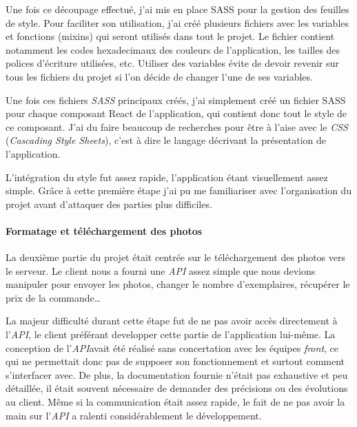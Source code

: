 \documentclass[12pt,a4paper]{article}
\begin{document}
  \bigskip

  Une fois ce découpage effectué, j'ai mis en place SASS pour la gestion
  des feuilles de style. Pour faciliter son utilisation, j'ai créé
  plusieurs fichiers avec les variables et fonctions (mixins) qui seront
  utilisés dans tout le projet. Le fichier contient notamment les codes
  hexadecimaux des couleurs de l'application, les tailles des polices
  d'écriture utilisées, etc. Utiliser des variables évite de devoir
  revenir sur tous les fichiers du projet si l'on décide de changer l'une
  de ses variables.

  \bigskip

  Une fois ces fichiers \emph{SASS} principaux créés, j'ai simplement créé
  un fichier SASS pour chaque composant React de l'application, qui
  contient donc tout le style de ce composant. J'ai du faire beaucoup de
  recherches pour être à l'aise avec le \emph{CSS} (\emph{Cascading Style
  Sheets}), c'est à dire le langage décrivant la présentation de
  l'application.

  \bigskip

  L'intégration du style fut assez rapide, l'application étant
  visuellement assez simple. Grâce à cette première étape j'ai pu me
  familiariser avec l'organisation du projet avant d'attaquer des parties
  plus difficiles.

  \bigskip

  \paragraph{Formatage et téléchargement des
  photos}\label{formatage-et-tuxe9luxe9chargement-des-photos}

  \bigskip

  La deuxième partie du projet était centrée sur le téléchargement des
  photos vers le serveur. Le client nous a fourni une \emph{API} assez
  simple que nous devions manipuler pour envoyer les photos, changer le
  nombre d'exemplaires, récupérer le prix de la commande\ldots{}

  \bigskip

  La majeur difficulté durant cette étape fut de ne pas avoir accès
  directement à l'\emph{API}, le client préférant developper cette partie
  de l'application lui-même. La conception de l'\emph{API}avait été
  réalisé sans concertation avec les équipes \emph{front}, ce qui ne
  permettait donc pas de supposer son fonctionnement et surtout comment
  s'interfacer avec. De plus, la documentation fournie n'était pas
  exhaustive et peu détaillée, il était souvent nécessaire de demander des
  précisions ou des évolutions au client. Même si la communication était
  assez rapide, le fait de ne pas avoir la main sur l'\emph{API} a ralenti
  considérablement le développement.
\end{document}
